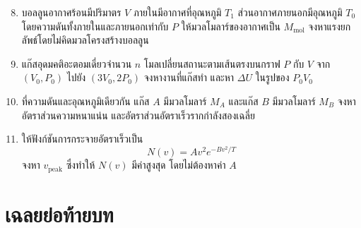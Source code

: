 \begin{enumerate}
    \setcounter{enumi}{7}
    \item บอลลูนอากาศร้อนมีปริมาตร $V$ ภายในมีอากาศที่อุณหภูมิ $T_1$ ส่วนอากาศภายนอกมีอุณหภูมิ $T_0$ โดยความดันทั้งภายในและภายนอกเท่ากับ $P$ ให้มวลโมลาร์ของอากาศเป็น $M_{\text{mol}}$ จงหาแรงยกลัพธ์โดยไม่คิดมวลโครงสร้างบอลลูน

    \item แก๊สอุดมคติอะตอมเดี่ยวจำนวน $n$ โมลเปลี่ยนสถานะตามเส้นตรงบนกราฟ $P$ กับ $V$ จาก $(V_0,P_0)$ ไปยัง $(3V_0,2P_0)$ จงหางานที่แก๊สทำ และหา $\Delta U$ ในรูปของ $P_0V_0$

    \item ที่ความดันและอุณหภูมิเดียวกัน แก๊ส $A$ มีมวลโมลาร์ $M_A$ และแก๊ส $B$ มีมวลโมลาร์ $M_B$ จงหาอัตราส่วนความหนาแน่น และอัตราส่วนอัตราเร็วรากกำลังสองเฉลี่ย

    \item ให้ฟังก์ชันการกระจายอัตราเร็วเป็น
    \[
    N(v)=Av^2e^{-Bv^2/T}
    \]
    จงหา $v_{\text{peak}}$ ซึ่งทำให้ $N(v)$ มีค่าสูงสุด โดยไม่ต้องหาค่า $A$
\end{enumerate}

\section{เฉลยย่อท้ายบท}

